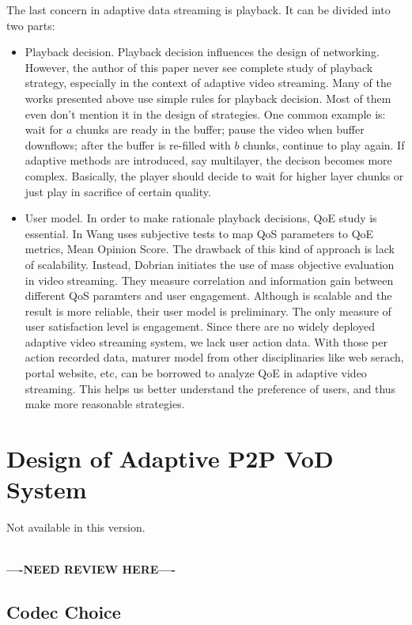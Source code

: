\documentclass[11pt,a4paper]{article}
\newcommand{\question}{\textbf{\\----NEED REVIEW HERE----\\}}
\begin{document}
The last concern in adaptive data streaming is playback. It
can be divided into two parts:
\begin{itemize}
	\item Playback decision. Playback decision influences the design
	of networking. However, the author of this paper never see complete 
	study of playback strategy, especially in the context of adaptive video 
	streaming. Many of the works presented above use simple rules for playback 
	decision. Most of them even don't mention it in the design of strategies. 
	One common example is: wait for $a$ chunks are ready in the buffer; 
	pause the video when buffer downflows; after the buffer is re-filled 
	with $b$ chunks, continue to play again. If adaptive methods are introduced, 
	say multilayer, the decison becomes more complex. Basically, the player 
	should decide to wait for higher layer chunks or just play in sacrifice 
	of certain quality. 
	\item User model. In order to make rationale playback decisions, QoE
	study is essential. In \cite{wang2011-perceptual} Wang uses subjective tests
	to map QoS parameters to QoE metrics, Mean Opinion Score. The drawback 
	of this kind of approach is lack of scalability. Instead, Dobrian
	initiates the use of mass objective evaluation in video
	streaming\cite{dobrian2011understanding}. They measure correlation
	and information gain between different QoS paramters and user 
	engagement. Although \cite{dobrian2011understanding} is scalable 
	and the result is more reliable, their user model is preliminary. 
	The only measure of user satisfaction level is engagement. 
	Since there are no widely deployed adaptive video streaming system, 
	we lack user action data. With those per action recorded data, 
	maturer model from other disciplinaries like web serach, portal 
	website, etc, can be borrowed to analyze QoE in adaptive video 
	streaming. This helps us better understand the preference of users, 
	and thus make more reasonable strategies. 
\end{itemize}

\section{Design of Adaptive P2P VoD System}
\label{sec:p2p_vod}

Not available in this version. 

\question

\subsection{Codec Choice}
\end{document}
